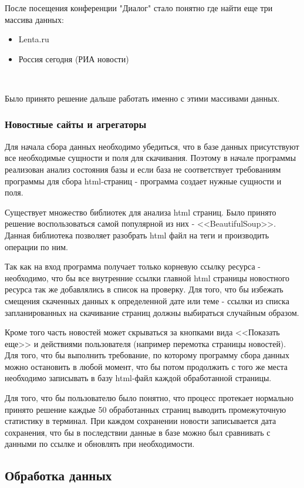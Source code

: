 После посещения конференции "Диалог" стало понятно где найти еще три массива данных: 

\begin{itemize}
    \item Lenta.ru
    \item Россия сегодня (РИА новости)
\end{itemize}
~\

Было принято решение дальше работать именно с этими массивами данных.

\subsubsection{Новостные сайты и агрегаторы}

Для начала сбора данных необходимо убедиться, что в базе данных присутствуют все необходимые сущности и поля для скачивания. Поэтому в начале программы реализован анализ состояния базы и если база не соответствует требованиям программы для сбора html-страниц - программа создает нужные сущности и поля.

Существует множество библиотек для анализа html страниц. Было принято решение воспользоваться самой популярной из них - <<BeautifulSoup>>. Данная библиотека позволяет разобрать html файл на теги и производить операции по ним.

Так как на вход программа получает только корневую ссылку ресурса - необходимо, что бы все внутренние ссылки главной html страницы новостного ресурса так же добавлялись в список на проверку. Для того, что бы избежать смещения скаченных данных к определенной дате или теме - ссылки из списка запланированных на скачивание страниц должны выбираться случайным образом.

Кроме того часть новостей может скрываться за кнопками вида <<Показать еще>> и действиями пользователя (например перемотка страницы новостей). Для того, что бы выполнить требование, по которому программу сбора данных можно остановить в любой момент, что бы потом продолжить с того же места необходимо записывать в базу html-файл каждой обработанной страницы.

Для того, что бы пользователю было понятно, что процесс протекает нормально принято решение каждые 50 обработанных страниц выводить промежуточную статистику в терминал. При каждом сохранении новости записывается дата сохранения, что бы в последствии данные в базе можно был сравнивать с данными по ссылке и обновлять при необходимости.

\subsection{Обработка данных}


